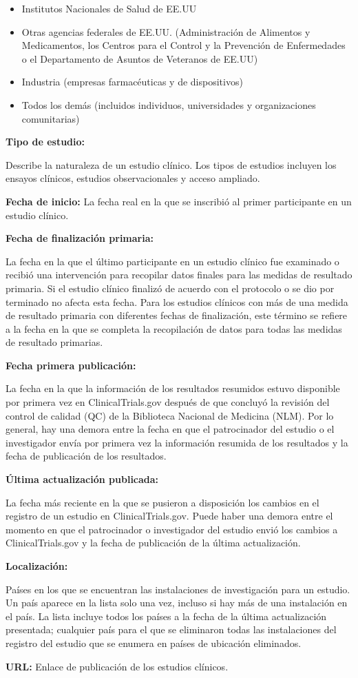 \documentclass[
]{article}
\begin{document}
\begin{itemize}
\item
  Institutos Nacionales de Salud de EE.UU
\item
  Otras agencias federales de EE.UU. (Administración de Alimentos y
  Medicamentos, los Centros para el Control y la Prevención de
  Enfermedades o el Departamento de Asuntos de Veteranos de EE.UU)
\item
  Industria (empresas farmacéuticas y de dispositivos)
\item
  Todos los demás (incluidos individuos, universidades y organizaciones
  comunitarias)
\end{itemize}

\textbf{Tipo de estudio:}

Describe la naturaleza de un estudio clínico. Los tipos de estudios
incluyen los ensayos clínicos, estudios observacionales y acceso
ampliado.

\textbf{Fecha de inicio:} La fecha real en la que se inscribió al primer
participante en un estudio clínico.

\textbf{Fecha de finalización primaria:}

La fecha en la que el último participante en un estudio clínico fue
examinado o recibió una intervención para recopilar datos finales para
las medidas de resultado primaria. Si el estudio clínico finalizó de
acuerdo con el protocolo o se dio por terminado no afecta esta fecha.
Para los estudios clínicos con más de una medida de resultado primaria
con diferentes fechas de finalización, este término se refiere a la
fecha en la que se completa la recopilación de datos para todas las
medidas de resultado primarias.

\textbf{Fecha primera publicación:}

La fecha en la que la información de los resultados resumidos estuvo
disponible por primera vez en ClinicalTrials.gov después de que concluyó
la revisión del control de calidad (QC) de la Biblioteca Nacional de
Medicina (NLM). Por lo general, hay una demora entre la fecha en que el
patrocinador del estudio o el investigador envía por primera vez la
información resumida de los resultados y la fecha de publicación de los
resultados.

\textbf{Última actualización publicada:}

La fecha más reciente en la que se pusieron a disposición los cambios en
el registro de un estudio en ClinicalTrials.gov. Puede haber una demora
entre el momento en que el patrocinador o investigador del estudio envió
los cambios a ClinicalTrials.gov y la fecha de publicación de la última
actualización.

\textbf{Localización:}

Países en los que se encuentran las instalaciones de investigación para
un estudio. Un país aparece en la lista solo una vez, incluso si hay más
de una instalación en el país. La lista incluye todos los países a la
fecha de la última actualización presentada; cualquier país para el que
se eliminaron todas las instalaciones del registro del estudio que se
enumera en países de ubicación eliminados.

\textbf{URL:} Enlace de publicación de los estudios clínicos.
\end{document}
